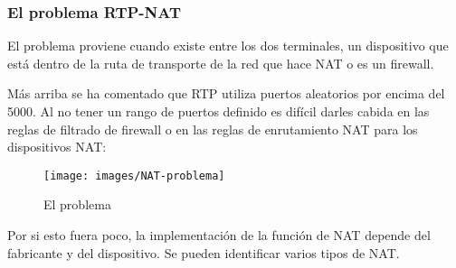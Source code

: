 \subsubsection{El problema RTP-NAT}
\label{sec:el-problema}

El problema proviene cuando existe entre los dos terminales, un dispositivo que está dentro de la ruta de transporte de la red que hace NAT  o es un firewall.

Más arriba se ha comentado que RTP utiliza puertos aleatorios por encima del 5000. Al no tener un rango de puertos definido es difícil darles cabida en las reglas de filtrado de firewall o en las reglas de enrutamiento NAT para los dispositivos NAT:

\begin{figure}[!h]
  \centering
  \texttt{[image: images/NAT-problema]}
  \caption{El problema}
  \label{fig:NAT-Problema}
\end{figure}
Por si esto fuera poco, la implementación de la función de NAT depende del fabricante y del dispositivo. Se pueden identificar varios tipos de NAT.

